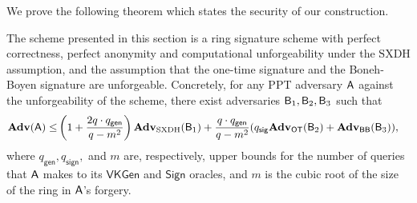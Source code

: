 We prove the following theorem which states the security of our construction.

\begin{theorem}\label{theo:security-sxdh}
The scheme presented in this section is a ring signature scheme
with perfect correctness, perfect anonymity and computational unforgeability under the
$\mathrm{SXDH}$ assumption, and the assumption
that the one-time signature and the Boneh-Boyen signature are unforgeable.
Concretely, for any PPT adversary $\mathsf{A}$ against the unforgeability of the scheme, there exist adversaries $\mathsf{B}_1,\mathsf{B}_2,\mathsf{B}_3$ such that
\begin{align*}
\mathbf{Adv}(\mathsf{A})\leq &\left(1+\frac{2q\cdot q_\mathsf{gen}}{q-m^2}\right)\mathbf{Adv}_{\mathrm{SXDH}}(\mathsf{B}_1)+\frac{q\cdot q_\mathsf{gen}}{q-m^2}(q_\mathsf{sig}\mathbf{Adv}_{\mathsf{OT}}(\mathsf{B}_2)+\mathbf{Adv}_{\mathsf{BB}}(\mathsf{B}_3)),
\end{align*}
where $q_\mathsf{gen},q_\mathsf{sign},$ and $m$ are, respectively, upper bounds for the number of queries that $\mathsf{A}$ makes to its $\mathsf{VKGen}$ and $\mathsf{Sign}$ oracles, and $m$ is the cubic root of the size of the ring in $\mathsf{A}$'s forgery.
\end{theorem}
